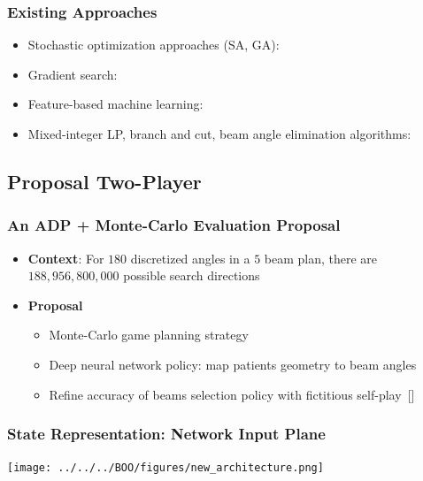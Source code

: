 \begin{frame}
\frametitle{Existing Approaches}
\begin{itemize}
		\small
		\item Stochastic optimization approaches (SA, GA): ~\cite{ Bortfeld1993, Sodertrom1993,Pugachev2000,Pugachev02,Aleman08, Bertsimas2013}
		\vspace{0.1in}
		\item Gradient search:~\cite{Stein97, Craft2007, Bertsimas2013}
		\vspace{0.1in}
		\item Feature-based machine learning:~\cite{lu2006learning, li2010feasible}
		\vspace{0.1in}
		\item Mixed-integer LP, branch and cut, beam angle elimination algorithms: ~\cite{wang2003optimization, dsouza, lim2007optimization,Jia2011}
\end{itemize}
\end{frame}

\subsection{Proposal Two-Player}
\begin{frame}
\frametitle{An ADP + Monte-Carlo Evaluation Proposal}
\begin{itemize}
	\item \textbf{Context}: For $180$ discretized angles in a $5$ beam plan, there are $188,956,800,000$ possible search directions
	\vspace{0.1in}
	\item \textbf{Proposal}
	
	\begin{itemize}
		\item Monte-Carlo game planning strategy
		\vspace{0.1in}
		\item Deep neural network policy: map patients geometry to beam angles
		\vspace{0.1in}
		\item Refine accuracy of beams selection policy with fictitious self-play~[\cite{Heinrich}] 
	\end{itemize}
\end{itemize}
\end{frame}

\begin{frame}
\frametitle{State Representation: Network Input Plane}
\texttt{[image: ../../../BOO/figures/new\_architecture.png]}
\end{frame}

